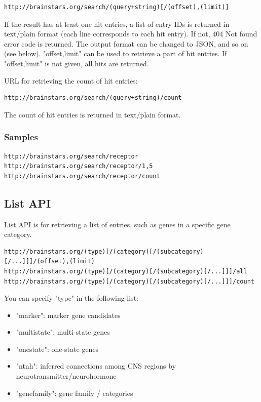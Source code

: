 \documentclass[12pt,fullpage]{article}
\begin{document}
\begin{verbatim}
http://brainstars.org/search/(query+string)[/(offset),(limit)]
\end{verbatim}

If the result has at least one hit entries, a list of entry IDs is returned in text/plain format (each line corresponds to each hit entry). If not, 404 Not found error code is returned. The output format can be changed to JSON, and so on (see below). "offset,limit" can be used to retrieve a part of hit entries. If "offset,limit" is not given, all hits are returned.

URL for retrieving the count of hit entries:
\begin{verbatim}
http://brainstars.org/search/(query+string)/count
\end{verbatim}

The count of hit entries is returned in text/plain format.

\subsubsection{Samples}
\begin{verbatim}
http://brainstars.org/search/receptor
http://brainstars.org/search/receptor/1,5
http://brainstars.org/search/receptor/count
\end{verbatim}

\subsection{List API}
List API is for retrieving a list of entries, such as genes in a specific gene category.

\begin{verbatim}
http://brainstars.org/(type)[/(category)[/(subcategory)[/...]]]/(offset),(limit)
http://brainstars.org/(type)[/(category)[/(subcategory)[/...]]]/all 
http://brainstars.org/(type)[/(category)[/(subcategory)[/...]]]/count
\end{verbatim}

You can specify "type" in the following list:
\begin{itemize}
  \item "marker": marker gene candidates
  \item "multistate": multi-state genes
  \item "onestate": one-state genes
  \item "ntnh": inferred connections among CNS regions by neurotransmitter/neurohormone
  \item "genefamily": gene family / categories
\end{itemize}
\end{document}
